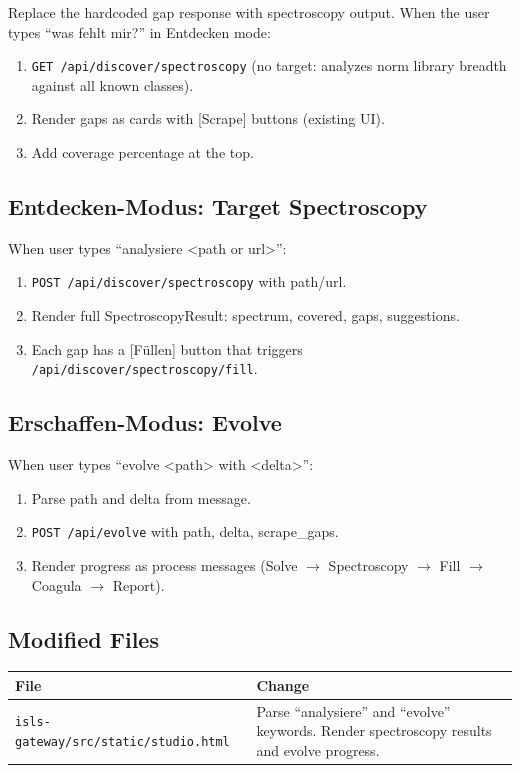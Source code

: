 \documentclass[11pt,a4paper]{article}
\begin{document}
Replace the hardcoded gap response with spectroscopy output. 
When the user types ``was fehlt mir?'' in Entdecken mode:

\begin{enumerate}[nosep]
\item \texttt{GET /api/discover/spectroscopy} (no target: 
      analyzes norm library breadth against all known classes).
\item Render gaps as cards with [Scrape] buttons (existing UI).
\item Add coverage percentage at the top.
\end{enumerate}

\subsection{Entdecken-Modus: Target Spectroscopy}

When user types ``analysiere <path or url>'':

\begin{enumerate}[nosep]
\item \texttt{POST /api/discover/spectroscopy} with path/url.
\item Render full SpectroscopyResult: spectrum, covered, gaps, 
      suggestions.
\item Each gap has a [F\"ullen] button that triggers 
      \texttt{/api/discover/spectroscopy/fill}.
\end{enumerate}

\subsection{Erschaffen-Modus: Evolve}

When user types ``evolve <path> with <delta>'':

\begin{enumerate}[nosep]
\item Parse path and delta from message.
\item \texttt{POST /api/evolve} with path, delta, scrape\_gaps.
\item Render progress as process messages (Solve $\to$ 
      Spectroscopy $\to$ Fill $\to$ Coagula $\to$ Report).
\end{enumerate}

\subsection{Modified Files}

\begin{longtable}{lp{10cm}}
\toprule
\textbf{File} & \textbf{Change} \\
\midrule
\texttt{isls-gateway/src/static/studio.html}
  & Parse ``analysiere'' and ``evolve'' keywords. Render 
    spectroscopy results and evolve progress. \\
\bottomrule
\end{longtable}
\end{document}
